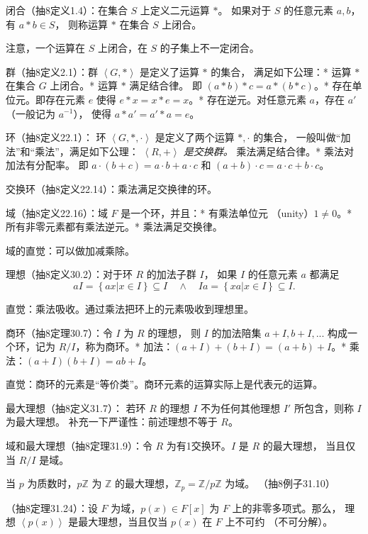 

闭合（抽8定义1.4）：在集合 $S$ 上定义二元运算 $*$。
如果对于 $S$ 的任意元素 $a, b$，有 $a* b\in S$，
则称运算 $*$ 在集合 $S$ 上闭合。

注意，一个运算在 $S$ 上闭合，在 $S$ 的子集上不一定闭合。

群（抽8定义2.1）：群 $\left<G, *\right>$ 是定义了运算 $*$ 的集合，
满足如下公理：* 运算 $*$ 在集合 $G$ 上闭合。* 运算 $*$ 满足结合律。
即 $(a*b)*c=a*(b*c)$。* 存在单位元。即存在元素 $e$ 使得 $e*x=x*e=x$。*
存在逆元。对任意元素 $a$，存在 $a'$（一般记为 $a^{-1}$），
使得 $a*a'=a'*a=e$。

环（抽8定义22.1）：
环 $\left<G, *, \cdot\right>$ 是定义了两个运算 $*, \cdot$ 的集合，
一般叫做“加法”和“乘法”，满足如下公理：
\emph{$\left<R, +\right>$ 是交换群。} 乘法满足结合律。*
乘法对加法有分配率。
即 $a\cdot(b+c)=a\cdot b+a\cdot c$ 和 $(a+b)\cdot c = a\cdot c + b\cdot c$。

交换环（抽8定义22.14）：乘法满足交换律的环。

域（抽8定义22.16）：域 $F$ 是一个环，并且：* 有乘法单位元
（unity）$1\ne 0$。* 所有非零元素都有乘法逆元。* 乘法满足交换律。

域的直觉：可以做加减乘除。

理想（抽8定义30.2）：对于环 $R$ 的加法子群 $I$，
如果 $I$ 的任意元素 $a$ 都满足
\begin{equation}\label{eq:misc-f2k:1}
aI=\left\{ax|x\in I\right\}\subseteq I
\quad \land \quad 
Ia=\left\{xa|x\in I\right\}\subseteq I.
\end{equation}

直觉：乘法吸收。通过乘法把环上的元素吸收到理想里。

商环（抽8定理30.7）：令 $I$ 为 $R$ 的理想，
则 $I$ 的加法陪集 $a+I, b+I,...$ 构成一个环，记为 $R/I$，称为商环。*
加法：$(a+I)+(b+I)=(a+b)+I$。* 乘法：$(a+I)(b+I)=ab+I$。

直觉：商环的元素是“等价类”。商环元素的运算实际上是代表元的运算。

最大理想（抽8定义31.7）：
若环 $R$ 的理想 $I$ 不为任何其他理想 $I'$ 所包含，则称 $I$ 为最大理想。
补充一下严谨性：前述理想不等于 $R$。

域和最大理想（抽8定理31.9）：令 $R$ 为有1交换环。$I$ 是 $R$ 的最大理想，
当且仅当 $R/I$ 是域。

当 $p$ 为质数时，$p\mathbb{Z}$ 为 $\mathbb{Z}$ 的最大理想，$\mathbb{Z}_p=\mathbb{Z}/p\mathbb{Z}$ 为域。
（抽8例子31.10）

（抽8定理31.24）：设 $F$ 为域，$p(x)\in F[x]$ 为 $F$ 上的非零多项式。那么，
理想 $\left<p(x)\right>$ 是最大理想，当且仅当 $p(x)$ 在 $F$ 上不可约
（不可分解）。

